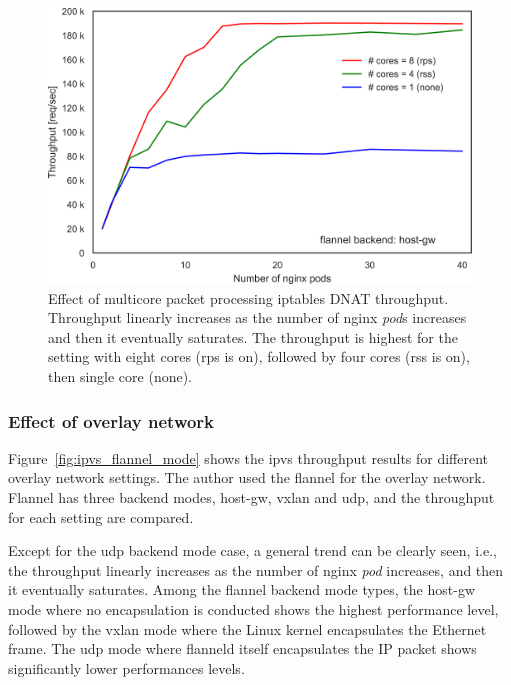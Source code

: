 \begin{figure}[h]
  \centering
  \includegraphics[width=0.75\columnwidth]{Figs/iptables_mcore_proccessing}
  \par\bigskip
  \centering
  \begin{minipage}{0.9\columnwidth}
    \caption[Effect of multicore packet processing on iptables DNAT throughput]{
Effect of multicore packet processing iptables DNAT throughput.
Throughput linearly increases as the number of nginx {\em pod}s increases and then it eventually saturates.
The throughput is highest for the setting with eight cores (rps is on), followed by four cores (rss is on), then single core (none).
    }
    \label{fig:iptables_mcore_proccessing}
  \end{minipage}
\end{figure}


\FloatBarrier

\subsubsection{Effect of overlay network}

Figure~\ref{fig:ipvs_flannel_mode} shows the ipvs throughput results for different overlay network settings.
The author used the flannel for the overlay network.
Flannel has three backend modes, host-gw, vxlan and udp, and the throughput for each setting are compared.

Except for the udp backend mode case, a general trend can be clearly seen, i.e., the throughput linearly increases as the number of nginx {\em pod} increases, and then it eventually saturates.
Among the flannel backend mode types, the host-gw mode where no encapsulation is conducted shows the highest performance level,
followed by the vxlan mode where the Linux kernel encapsulates the Ethernet frame.
The udp mode where flanneld itself encapsulates the IP packet shows significantly lower performances levels.

